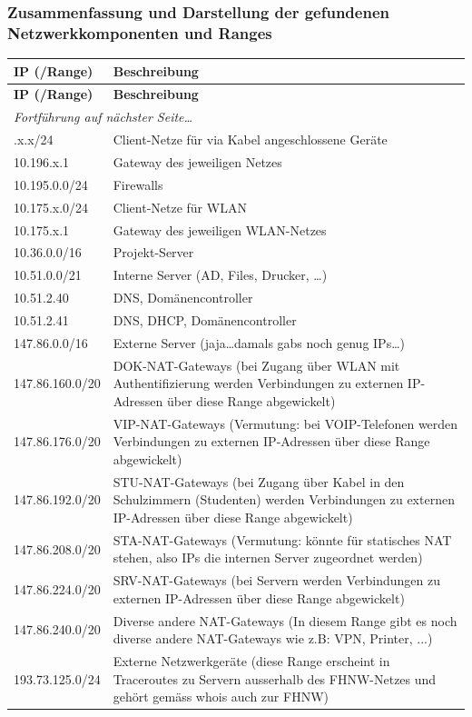 \documentclass[a4paper,11pt]{scrartcl}
\begin{document}
\subsubsection{Zusammenfassung und Darstellung der gefundenen Netzwerkkomponenten und Ranges}
\label{summary-ipranges}
\begin{longtable}{p{3cm}|p{9cm}}
	\textbf{IP (/Range)} & \textbf{Beschreibung} \\
	\hline
	\endfirsthead
	\textbf{IP (/Range)} & \textbf{Beschreibung} \\
	\hline
	\endhead
	\hline
	\multicolumn{2}{l}{\textit{Fortführung auf nächster Seite\ldots}} \\
	\endfoot
	\endlastfoot
	10.196.x.x/24	&	Client-Netze für via Kabel angeschlossene Geräte \\
	10.196.x.1		&	Gateway des jeweiligen Netzes \\
	10.195.0.0/24	&	Firewalls \\
	10.175.x.0/24	&	Client-Netze für WLAN \\
	10.175.x.1		&	Gateway des jeweiligen WLAN-Netzes \\
	10.36.0.0/16	&	Projekt-Server \\
	10.51.0.0/21	&	Interne Server (AD, Files, Drucker, \ldots) \\
	10.51.2.40		&	DNS, Domänencontroller \\
	10.51.2.41		&	DNS, DHCP, Domänencontroller \\
	147.86.0.0/16	&	Externe Server (jaja\ldots damals gabs noch genug IPs\ldots)\\
	147.86.160.0/20	&	DOK-NAT-Gateways (bei Zugang über WLAN mit Authentifizierung werden Verbindungen zu externen IP-Adressen über diese Range abgewickelt)\\
	147.86.176.0/20	&	VIP-NAT-Gateways (Vermutung: bei VOIP-Telefonen werden Verbindungen zu externen IP-Adressen über diese Range abgewickelt)\\
	147.86.192.0/20	&	STU-NAT-Gateways (bei Zugang über Kabel in den Schulzimmern (Studenten) werden Verbindungen zu externen IP-Adressen über diese Range abgewickelt)\\
	147.86.208.0/20	&	STA-NAT-Gateways (Vermutung: könnte für \glqq{}statisches NAT\grqq{} stehen, also IPs die internen Server zugeordnet werden)\\
	147.86.224.0/20	&	SRV-NAT-Gateways (bei Servern werden Verbindungen zu externen IP-Adressen über diese Range abgewickelt)\\
	147.86.240.0/20	&	Diverse andere NAT-Gateways (In diesem Range gibt es noch diverse andere NAT-Gateways wie z.B: VPN, Printer, ...)\\
	193.73.125.0/24	&	Externe Netzwerkgeräte (diese Range erscheint in Traceroutes zu Servern ausserhalb des FHNW-Netzes und gehört gemäss whois auch zur FHNW)
\end{longtable}
\end{document}

